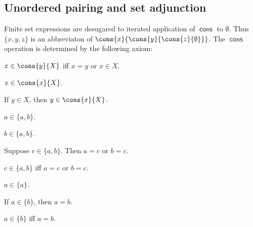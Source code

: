 \subsection{Unordered pairing and set adjunction}

Finite set expressions are desugared to
iterated application of $\operatorname{\textsf{cons}}$ to $\emptyset$.
Thus $\{x,y,z\}$ is an abbreviaton of
$\cons{x}{\cons{y}{\cons{z}{\emptyset}}}$.
The $\operatorname{\textsf{cons}}$ operation is determined by the following axiom:
%
\begin{axiom}\label{cons_iff}
    $x\in \cons{y}{X}$ iff $x = y$ or $x\in X$.
\end{axiom}

\begin{proposition}\label{cons_left}
    $x\in \cons{x}{X}$.
\end{proposition}

\begin{proposition}\label{cons_right}
    If $y\in X$, then $y\in \cons{x}{X}$.
\end{proposition}



\begin{proposition}\label{upair_intro_left}
    $a\in\{a,b\}$.
\end{proposition}

\begin{proposition}\label{upair_intro_right}
    $b\in\{a,b\}$.
\end{proposition}

\begin{proposition}\label{upair_elim}
    Suppose $c\in\{a,b\}$. Then $a = c$ or $b = c$.
\end{proposition}

\begin{proposition}\label{upair_iff}
    $c\in\{a,b\}$ iff $a = c$ or $b = c$.
\end{proposition}



\begin{proposition}\label{singleton_intro}
    $a\in\{a\}$.
\end{proposition}

\begin{proposition}\label{singleton_elim}
    If $a\in\{b\}$, then $a = b$.
\end{proposition}

\begin{proposition}\label{singleton_iff}
    $a\in\{b\}$ iff $a = b$.
\end{proposition}

